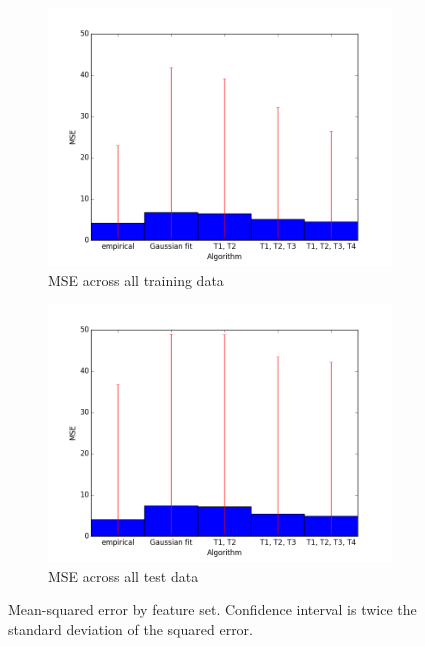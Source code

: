 \documentclass[12pt,letterpaper]{article}
\begin{document}
\begin{figure}[H]
\centering
\begin{subfigure}{.5\textwidth}
  \centering
  \includegraphics[width=1.1\textwidth]{images/mse_training.png}
  \caption{MSE across all training data}
  \label{fig:sub1}
\end{subfigure}%
\begin{subfigure}{.5\textwidth}
  \centering
  \includegraphics[width=1.1\textwidth]{images/mse_test.png}
  \caption{MSE across all test data}
  \label{fig:sub2}
\end{subfigure}
\caption{Mean-squared error by feature set. Confidence interval is twice the standard deviation of the squared error.}
\label{fig:mse}
\end{figure}
\end{document}
